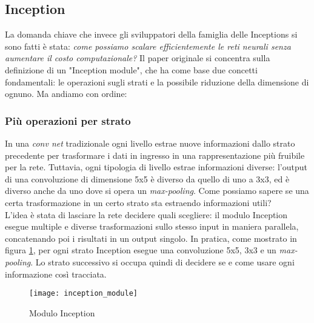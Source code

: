\subsection{Inception}
La domanda chiave che invece gli sviluppatori della famiglia delle Inceptions si sono fatti è stata: \textit{come possiamo scalare efficientemente le reti neurali senza aumentare il costo computazionale?}\cite{site:intuitive_guide_DNN_architecture} 
Il paper originale\cite{site:inception} si concentra sulla definizione di un "Inception module", che ha come base due concetti fondamentali: le operazioni sugli strati e la possibile riduzione della dimensione di ognuno. Ma andiamo con ordine:

\subsubsection*{Più operazioni per strato}
In una \textit{conv net} tradizionale ogni livello estrae nuove informazioni dallo strato precedente per trasformare i dati in ingresso in una rappresentazione più fruibile per la rete. Tuttavia, ogni tipologia di livello estrae informazioni diverse: l'output di una convoluzione di dimensione 5x5 è diverso da quello di uno a 3x3, ed è diverso anche da uno dove si opera un \textit{max-pooling}. Come possiamo sapere se una certa trasformazione in un certo strato sta estraendo informazioni utili?
\medskip 
\\L'idea è stata di lasciare la rete decidere quali scegliere: il modulo Inception esegue multiple e diverse trasformazioni sullo stesso input in maniera parallela, concatenando poi i risultati in un output singolo. In pratica, come mostrato in figura \ref{img:inception_module}, per ogni strato Inception esegue una convoluzione 5x5, 3x3 e un \textit{max-pooling}. Lo strato successivo si occupa quindi di decidere se e come usare ogni informazione così tracciata.
\begin{figure}[!h] 
	\centering 
	\texttt{[image: inception\_module]} 
	\caption{Modulo Inception}
	\label{img:inception_module}
\end{figure}

